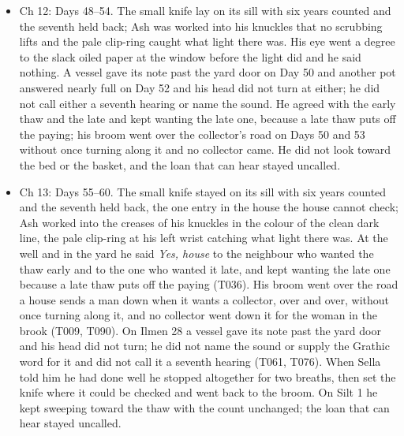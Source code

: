 \documentclass{design/chronicle}
\begin{document}
{\begin{itemize}[leftmargin=1.4em,itemsep=1pt,topsep=3pt,parsep=0pt]
\item Ch 12: Days 48–54. The small knife lay on its sill with six years counted and the seventh held back; Ash was worked into his knuckles that no scrubbing lifts and the pale clip-ring caught what light there was. His eye went a degree to the slack oiled paper at the window before the light did and he said nothing. A vessel gave its note past the yard door on Day 50 and another pot answered nearly full on Day 52 and his head did not turn at either; he did not call either a seventh hearing or name the sound. He agreed with the early thaw and the late and kept wanting the late one, because a late thaw puts off the paying; his broom went over the collector’s road on Days 50 and 53 without once turning along it and no collector came. He did not look toward the bed or the basket, and the loan that can hear stayed uncalled.

\end{itemize}

\begin{itemize}[leftmargin=1.4em,itemsep=1pt,topsep=3pt,parsep=0pt]

\item Ch 13: Days 55--60. The small knife stayed on its sill with six years counted and the seventh held back, the one entry in the house the house cannot check; Ash worked into the creases of his knuckles in the colour of the clean dark line, the pale clip-ring at his left wrist catching what light there was. At the well and in the yard he said \emph{Yes, house} to the neighbour who wanted the thaw early and to the one who wanted it late, and kept wanting the late one because a late thaw puts off the paying (T036). His broom went over the road a house sends a man down when it wants a collector, over and over, without once turning along it, and no collector went down it for the woman in the brook (T009, T090). On Ilmen 28 a vessel gave its note past the yard door and his head did not turn; he did not name the sound or supply the Grathic word for it and did not call it a seventh hearing (T061, T076). When Sella told him he had done well he stopped altogether for two breaths, then set the knife where it could be checked and went back to the broom. On Silt 1 he kept sweeping toward the thaw with the count unchanged; the loan that can hear stayed uncalled.

\end{itemize}

\begin{itemize}[leftmargin=1.4em,itemsep=1pt,topsep=3pt,parsep=0pt]


\end{itemize}}
\end{document}
